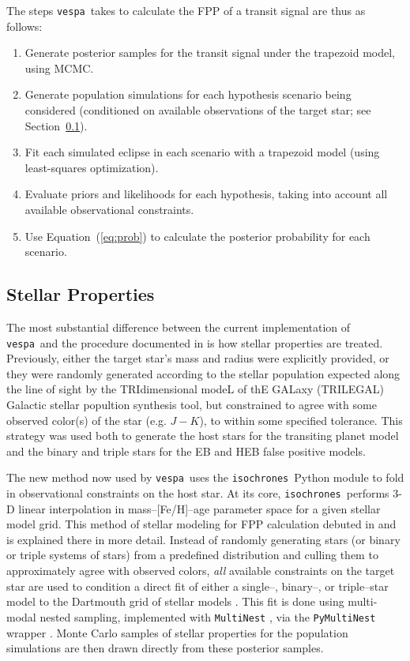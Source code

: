 \documentclass{emulateapj}
\newcommand{\Eq}[1]{Equation~(\ref{eq:#1})}
\newcommand{\eq}[1]{\Eq{#1}}
\newcommand{\sectionname}{Section}
\newcommand{\Sect}[1]{\sectionname~\ref{sect:#1}}
\newcommand{\sect}[1]{\Sect{#1}}
\newcommand{\sectlabel}[1]{\label{sect:#1}}
\newcommand{\vespa}{\texttt{vespa}}
\newcommand{\isochrones}{\texttt{isochrones}}
\begin{document}
The steps \vespa\ takes to calculate the FPP of a transit signal
are thus as follows:
\begin{enumerate}
\item Generate posterior samples for the transit signal under the
  trapezoid model, using MCMC.
\item Generate population simulations for each hypothesis scenario
  being considered (conditioned on available observations of the
  target star; see \sect{methods:stellar}).
\item Fit each simulated eclipse in each scenario with a trapezoid
  model (using least-squares optimization).
\item Evaluate priors and likelihoods for each hypothesis, taking into
  account all available observational constraints.
\item Use \eq{prob} to calculate the posterior probability for each scenario.
\end{enumerate}


\subsection{Stellar Properties}
\sectlabel{methods:stellar}

The most substantial difference between the current implementation of
\vespa\ and the procedure documented in  is
how stellar properties are treated.  Previously, either the target
star's mass and radius were explicitly provided, or they were randomly
generated according to the stellar population expected along the line
of sight by the TRIdimensional modeL of thE GALaxy (TRILEGAL) Galactic
stellar popultion synthesis tool, but constrained to agree with some
observed color(s) of the star (e.g. $J-K$), to within some specified
tolerance.  This strategy was used both to generate the host stars for
the transiting planet model and the binary and triple stars for the EB
and HEB false positive models.

The new method now used by \vespa\ uses the \isochrones\ Python module
\citep{isochrones} to fold in observational constraints on the host
star.  At its core, \isochrones\ performs 3-D linear interpolation in
mass--[Fe/H]--age parameter space for a given stellar model grid.
This method of stellar modeling for FPP calculation debuted in
\citet{Montet:2015} and is explained there in more detail.  Instead of
randomly generating stars (or binary or triple systems of stars) from
a predefined distribution and culling them to approximately agree with
observed colors, \emph{all} available constraints on the target star
are used to condition a direct fit of either a single--, binary--, or
triple--star model to the Dartmouth grid of stellar models
\citep{Dotter:2008, Feiden:2011}.  This fit is done using multi-modal
nested sampling, implemented with \texttt{MultiNest}
\citep{Feroz:2009, Feroz:2011, Feroz:2013}, via the
\texttt{PyMultiNest} wrapper \citep{Buchner:2014}.  Monte Carlo
samples of stellar properties for the population simulations are then
drawn directly from these posterior samples.
\end{document}

